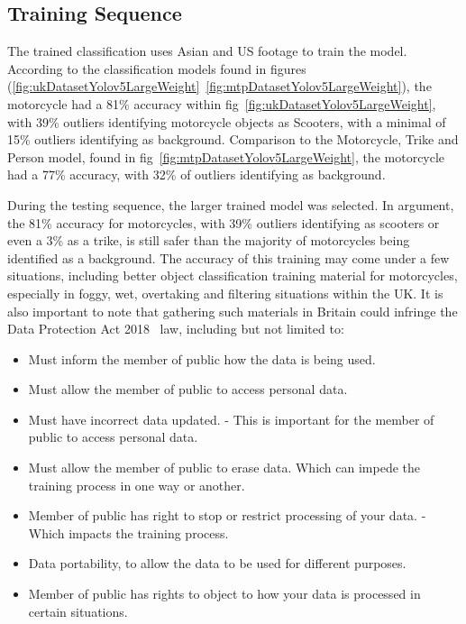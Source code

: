 \documentclass[conference]{IEEEtran}
\begin{document}
	\subsection{Training Sequence}
		The trained classification uses Asian and US footage to train the model. According to the classification models found in figures (\ref{fig:ukDatasetYolov5LargeWeight}~\ref{fig:mtpDatasetYolov5LargeWeight}), the motorcycle had a 81\% accuracy within fig~\ref{fig:ukDatasetYolov5LargeWeight}, with 39\% outliers identifying motorcycle objects as Scooters, with a minimal of 15\% outliers identifying as background. Comparison to the Motorcycle, Trike and Person model, found in fig~\ref{fig:mtpDatasetYolov5LargeWeight}, the motorcycle had a 77\% accuracy, with 32\% of outliers identifying as background.

		During the testing sequence, the larger trained model was selected. In argument, the 81\% accuracy for motorcycles, with 39\% outliers identifying as scooters or even a 3\% as a trike, is still safer than the majority of motorcycles being identified as a background. The accuracy of this training may come under a few situations, including better object classification training material for motorcycles, especially in foggy, wet, overtaking and filtering situations within the UK. It is also important to note that gathering such materials in Britain could infringe the Data Protection Act 2018~\cite{govuk_data_2018} law, including but not limited to:

		\begin{itemize}
			\item Must inform the member of public how the data is being used.
			\item Must allow the member of public to access personal data.
			\item Must have incorrect data updated. - This is important for the member of public to access personal data.
			\item Must allow the member of public to erase data. Which can impede the training process in one way or another.
			\item Member of public has right to stop or restrict processing of your data. - Which impacts the training process.
			\item Data portability, to allow the data to be used for different purposes.
			\item Member of public has rights to object to how your data is processed in certain situations.
		\end{itemize}
\end{document}
